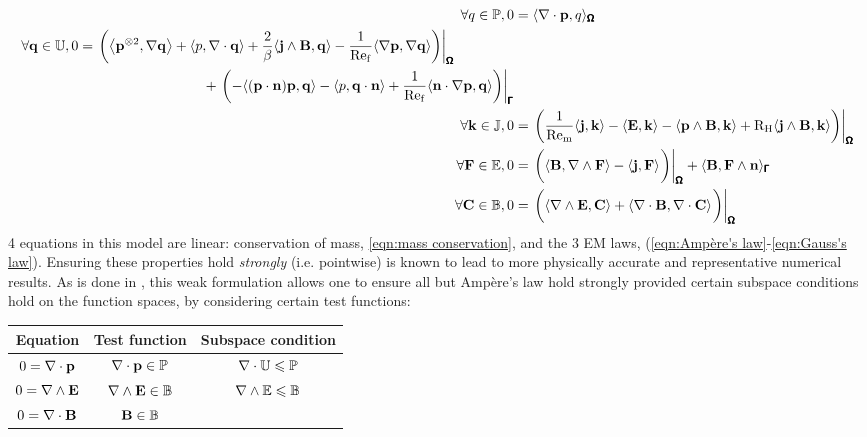     \begin{align}
        \forall q \in \bbP,  0  &=  \langle\nabla\cdot\bfp, q\rangle_{\bfOmega}  \\
        \begin{split}
            \forall \bfq \in \bbU,  0  &=  \left.\left(\left\langle\bfp^{\otimes 2}, \nabla\bfq\right\rangle + \langle p, \nabla\cdot\bfq\rangle + \frac{2}{\beta}\langle\bfj\wedge\bfB, \bfq\rangle - \frac{1}{\rmRef}\langle\nabla\bfp, \nabla\bfq\rangle\right)\right|_{\bfOmega}  \\
            &\;\;\;\;\;\;\;\;\;\;\;\;\;\;\;\;\;\;\;\;\;\;\;\;\;\;\;\;\;\;\;\;  + \left.\left(- \langle(\bfp\cdot\bfn)\bfp, \bfq\rangle - \langle p, \bfq\cdot\bfn\rangle + \frac{1}{\rmRef}\langle\bfn\cdot\nabla\bfp, \bfq\rangle\right)\right|_{\bfGamma}
        \end{split}  \\
        \forall \bfk \in \bbJ,  0  &=  \left.\left(\frac{1}{\rmRem}\langle\bfj, \bfk\rangle - \langle\bfE, \bfk\rangle - \langle\bfp\wedge\bfB, \bfk\rangle + \rmRH\langle\bfj\wedge\bfB, \bfk\rangle\right)\right|_{\bfOmega}  \\
        \forall \bfF \in \bbE,  0  &=  \left.\left(\langle\bfB, \nabla\wedge\bfF\rangle - \langle\bfj, \bfF\rangle\tall\right)\right|_{\bfOmega} + \langle\bfB, \bfF\wedge\bfn\rangle_{\bfGamma}  \\
        \forall \bfC \in \bbB,  0  &=  \left.\left(\langle\nabla\wedge\bfE, \bfC\rangle + \langle\nabla\cdot\bfB, \nabla\cdot\bfC\rangle\tall\right)\right|_{\bfOmega}
    \end{align}
    4 equations in this model are linear: conservation of mass, \ref{eqn:mass conservation}, and the 3 EM laws, (\ref{eqn:Ampère's law}-\ref{eqn:Gauss's law}). Ensuring these properties hold \emph{strongly} (i.e. pointwise) is known to lead to more physically accurate and representative numerical results. \BA{[Ref, ...]}  As is done in \cite{LFM22}, this weak formulation allows one to ensure all but Ampère's law hold strongly provided certain subspace conditions hold on the function spaces, by considering certain test functions: 
    \begin{center}\begin{tabular}{ c | c | c }
        Equation  &  Test function  &  Subspace condition  \\
        \hline\hline
        $0  =  \nabla\cdot\mathbf{p}$  &  $\nabla\cdot\mathbf{p}  \in  \mathbb{P}$  &  $\nabla\cdot\mathbb{U}  \leqslant  \mathbb{P}$  \\
        $0  =  \nabla\wedge\mathbf{E}$  &  $\nabla\wedge\mathbf{E}  \in  \mathbb{B}$  &  $\nabla\wedge\mathbb{E}  \leqslant  \mathbb{B}$  \\
        $0  =  \nabla\cdot\mathbf{B}$  &  $\mathbf{B}  \in  \mathbb{B}$  &
    \end{tabular}\end{center}
